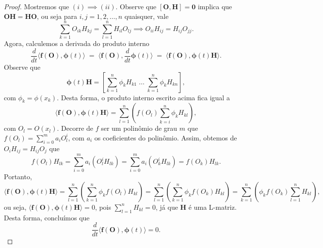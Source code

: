\documentclass[twoside,openright,titlepage,numbers=noenddot,headinclude,  lineheaders footinclude=true,cleardoublepage=empty,
                                BCOR=5mm,paper=a4,fontsize=12pt ]{scrbook}
\theoremstyle{definition}
\begin{document}
\begin{proof}
Mostremos que $(i) \implies (ii)$.
Observe que $[\bm{O}, \bm{H}] = \bm{0}$ implica que 
$\bm{O}\bm{H} = \bm{H}\bm{O}$, ou seja para $i,j = 1, 2, \ldots, n$
quaisquer, vale
\[
\sum_{k=1}^n O_{ik} H_{kj} = \sum_{l=1}^n H_{il}O_{lj} \implies
O_{ii}H_{ij} = H_{ij}O_{jj}.
\]
Agora, calculemos a derivada do produto interno
\[
\frac{d}{dt} \langle \bm{f(O)}, \bm{\phi}(t) \rangle  \;=\;
\langle \bm{f(O)}, \frac{d}{dt}\bm{\phi}(t)  \rangle  \;= \;
\langle \bm{f(O)}, \bm{\phi}(t)\bm{H}\rangle.
\]
Observe que 
\[
\bm{\phi}(t)\bm{H} = \left[ \sum_{k=1}^n \phi_k H_{k1} \; \ldots \;
\sum_{k=1}^n \phi_k H_{kn} \right],
\]
com $\phi_k = \phi(x_k)$. Desta forma, o produto interno escrito 
acima fica igual a
\[
\langle \bm{f(O)}, \bm{\phi}(t)\bm{H} \rangle = 
\sum_{l=1}^n \left( f(O_l) \sum_{k=i}^n \phi_k H_{kl}  \right),
\]
com $O_l = O(x_l)$. Decorre de $f$ ser um polinômio de grau $m$ que
$f(O_l) = \sum_{i=0}^m a_i O_l^i$, com $a_i$ os coeficientes do polinômio.
Assim, obtemos de 
$O_{i}H_{ij} = H_{ij}O_{j}$ que
\[
f(O_l) H_{lk} = \sum_{i=0}^m a_i ( O_l^i H_{lk} ) =
\sum_{i=0}^m a_i ( O_k^i H_{lk} ) = 
f(O_k) H_{lk}.
\]
Portanto,
\[
\langle \bm{f(O)}, \bm{\phi}(t)\bm{H} \rangle = 
\sum_{l=1}^n \left( \sum_{k=1}^n \phi_k f(O_l) H_{kl}  \right) = 
\sum_{l=1}^n \left( \sum_{k=1}^n \phi_k f(O_k) H_{kl}  \right) =
\sum_{k=1}^n \left( \phi_k f(O_k) \sum_{l=1}^n H_{kl}  \right),
\]
ou seja, $
\langle \bm{f(O)}, \bm{\phi}(t)\bm{H} \rangle = 0$,
pois $\sum_{l=1}^n H_{kl}=0$, já que $\bm{H}$ é uma L-matriz.
Desta forma, concluímos que 
\[\frac{d}{dt} \langle \bm{f(O)}, \bm{\phi}(t) \rangle  = 0.\]


\end{proof}
\end{document}
